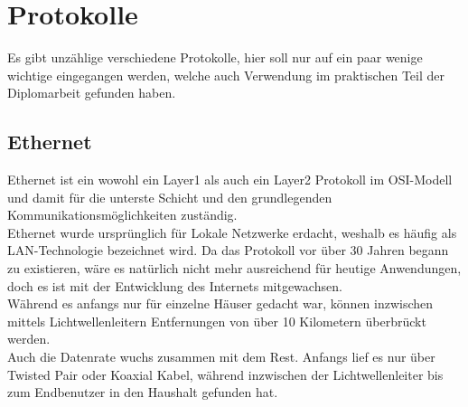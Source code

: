 \documentclass[11pt,a4paper]{report}
\begin{document}
\section{Protokolle}
Es gibt unzählige verschiedene Protokolle, hier soll nur auf ein paar wenige wichtige eingegangen werden, welche auch Verwendung im praktischen Teil der Diplomarbeit gefunden haben.
\subsection{Ethernet}\label{ssec:eth}
Ethernet ist ein wowohl ein Layer1 als auch ein Layer2 Protokoll im OSI-Modell und damit für die unterste Schicht und den grundlegenden Kommunikationsmöglichkeiten zuständig.\\

Ethernet wurde ursprünglich für Lokale Netzwerke erdacht, weshalb es häufig als LAN-Technologie bezeichnet wird. Da das Protokoll vor über 30 Jahren begann zu existieren, wäre es natürlich nicht mehr ausreichend für heutige Anwendungen, doch es ist mit der Entwicklung des Internets mitgewachsen.\\
Während es anfangs nur für einzelne Häuser gedacht war, können inzwischen mittels Lichtwellenleitern Entfernungen von über 10 Kilometern überbrückt werden.\\

Auch die Datenrate wuchs zusammen mit dem Rest. Anfangs lief es nur über Twisted Pair oder Koaxial Kabel, während inzwischen der Lichtwellenleiter bis zum Endbenutzer in den Haushalt gefunden hat.\\
\end{document}
